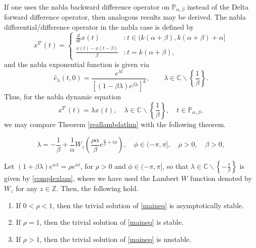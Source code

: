 \documentclass[10pt,a4paper]{amsart}
\newcommand{\C}{\ensuremath{\mathbb{C}}}
\newcommand{\Z}{\ensuremath{\mathbb{Z}}}
\newcommand{\p}{\ensuremath{\mathbb{P}}}
\begin{document}
\begin{remark}
If one uses the nabla backward difference operator on $\p_{\alpha,\beta}$ instead of the Delta forward difference operator, then analogous results may be derived. The nabla differential/difference operator in the nabla case is defined by
\[ x^{\nabla}(t) = \begin{cases} \frac{d}{dt}x(t) &: t\in(k(\alpha+\beta),k(\alpha+\beta)+\alpha] \\ \frac{x(t)-x(t-\beta)}{\beta} &: t=k(\alpha+\beta), \end{cases} \]
and the nabla exponential function is given via
\begin{equation}\label{nablaexpo}
 \widehat{e}_\lambda(t,0) = \frac{e^{\lambda t}}{[(1-\beta\lambda)e^{\beta\lambda}]^k}, \qquad \lambda\in\C\backslash\left\{\frac{1}{\beta}\right\}.
\end{equation}
Thus, for the nabla dynamic equation
\begin{equation}\label{nabeq}
 x^\nabla(t) = \lambda x(t), \quad \lambda\in\C\backslash\left\{\frac{1}{\beta}\right\}, \quad t\in\p_{\alpha,\beta},
\end{equation}
we may compare Theorem \ref{reallambdathm} with the following theorem.
\end{remark}

\begin{equation}\label{complexlam}
 \lambda = -\frac{1}{\beta}+\frac{1}{\alpha}W_z\left(\frac{\rho \alpha}{\beta}e^{\frac{\alpha}{\beta}+i\phi}\right), \quad \phi\in(-\pi,\pi], \quad \rho >0, \quad \beta>0,
\end{equation} 

\begin{theorem}\label{complexTHM}
Let $(1+\beta\lambda)e^{\alpha\lambda}=\rho e^{i\phi}$, for $\rho >0$ and $\phi\in(-\pi,\pi]$, so that $\lambda\in\C\backslash\left\{-\frac{1}{\beta}\right\}$ is given by \eqref{complexlam}, where we have used the Lambert $W$ function denoted by $W_z$ for any $z\in\Z$. Then, the following hold.
\begin{enumerate}
\item[(a)] If $0<\rho<1$, then the trivial solution of \eqref{maineq} is asymptotically stable.
\item[(b)] If $\rho =1$, then the trivial solution of \eqref{maineq} is stable.
\item[(c)] If $\rho>1$, then the trivial solution of \eqref{maineq} is unstable.
\end{enumerate}
\end{theorem}
\end{document}
